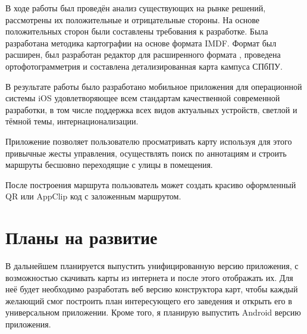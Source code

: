 В ходе работы был проведён анализ существующих на рынке решений, рассмотрены их положительные и отрицательные стороны. На основе положительных сторон были составлены требования к разработке. Была разработана методика картографии на основе формата IMDF. Формат был расширен, был разработан редактор для расширенного формата , проведена ортофотограмметрия  и составлена детализированная карта кампуса СПбПУ.

В результате работы было разработано мобильное приложения для операционной системы iOS удовлетворяющее всем стандартам качественной современной разработки, в том числе поддержка всех видов актуальных устройств, светлой и тёмной темы, интернационализации.

Приложение позволяет пользователю просматривать карту используя для этого привычные жесты управления, осуществлять поиск по аннотациям и строить маршруты бесшовно переходящие с улицы в помещения.

После построения маршрута пользователь может создать красиво оформленный QR или AppClip код с заложенным маршрутом.


\section{Планы на развитие}
  В дальнейшем планируется выпустить унифицированную версию приложения, с возможностью скачивать карты из интернета и после этого отображать их. Для неё будет необходимо разработать веб версию конструктора карт, чтобы каждый желающий смог построить план интересующего его заведения и открыть его в универсальном приложении. Кроме того, я планирую выпустить Android версию приложения.

